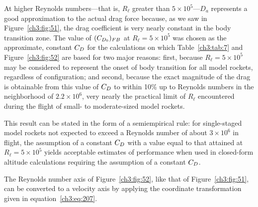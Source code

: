 At higher Reynolds numbers---that is, $R_\ell$ greater than $5 \times 10^{5}$---$D_a$ represents a
good approximation to the actual drag force because, as we saw in Figure~\ref{ch3:fig:51}, the drag
coefficient is very nearly constant in the body transition zone. The value of $(C_{D_0})_{FB}$ at
$R_\ell = 5 \times 10^{5}$ was chosen as the approximate, constant $C_{D}$ for the calculations on
which Table~\ref{ch3:tab:7} and Figure~\ref{ch3:fig:52} are based for two major reasons: first,
because $R_\ell = 5 \times 10^{5}$ may be considered to represent the onset of body transition for
all model rockets, regardless of configuration; and second, because the exact magnitude of the drag
is obtainable from this value of $C_{D}$ to within 10\% up to Reynolds numbers in the neighborhood of
$2.2 \times 10^{6}$, very nearly the practical limit of $R_\ell$ encountered during the flight of
small- to moderate-sized model rockets.

This result can be stated in the form of a semiempirical rule: for single-staged model rockets not
expected to exceed a Reynolds number of about $3 \times 10^{6}$ in flight, the assumption of a
constant $C_{D}$ with a value equal to that attained at $R_\ell = 5 \times 10^{5}$ yields acceptable
estimates of performance when used in closed-form altitude calculations requiring the assumption
of a constant $C_{D}$.

The Reynolds number axis of Figure~\ref{ch3:fig:52}, like that of Figure~\ref{ch3:fig:51}, can be
converted to a velocity axis by applying the coordinate transformation given in
equation~\eqref{ch3:eq:207}.
